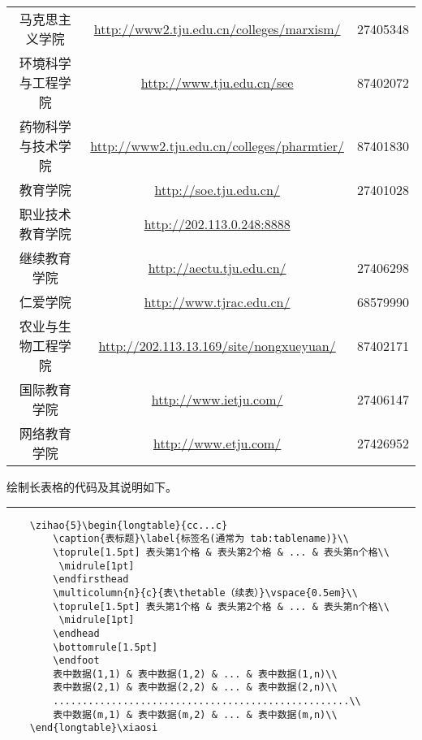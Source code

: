 \begin{longtable}{ccc}
	马克思主义学院           & \url{http://www2.tju.edu.cn/colleges/marxism/}        & 27405348      \\
	环境科学与工程学院       & \url{http://www.tju.edu.cn/see}                       & 87402072      \\
	药物科学与技术学院       & \url{http://www2.tju.edu.cn/colleges/pharmtier/}      & 87401830      \\
	教育学院                 & \url{http://soe.tju.edu.cn/}                          & 27401028      \\
	职业技术教育学院         & \url{http://202.113.0.248:8888}                                       \\
	继续教育学院             & \url{http://aectu.tju.edu.cn/}                        & 27406298      \\
	仁爱学院                 & \url{http://www.tjrac.edu.cn/}                        & 68579990      \\
	农业与生物工程学院       & \url{http://202.113.13.169/site/nongxueyuan/}         & 87402171      \\
	国际教育学院             & \url{http://www.ietju.com/}                           & 27406147      \\
	网络教育学院             & \url{http://www.etju.com/}                            & 27426952      \\
\end{longtable}
\vspace{\baselineskip}

绘制长表格的代码及其说明如下。
\vspace{1em}\noindent\hrule

\begin{verbatim}
	\zihao{5}\begin{longtable}{cc...c}
		\caption{表标题}\label{标签名(通常为 tab:tablename)}\\
		\toprule[1.5pt] 表头第1个格 & 表头第2个格 & ... & 表头第n个格\\
		 \midrule[1pt]
		\endfirsthead
		\multicolumn{n}{c}{表\thetable（续表）}\vspace{0.5em}\\
		\toprule[1.5pt] 表头第1个格 & 表头第2个格 & ... & 表头第n个格\\
		 \midrule[1pt]
		\endhead
		\bottomrule[1.5pt]
		\endfoot
		表中数据(1,1) & 表中数据(1,2) & ... & 表中数据(1,n)\\
		表中数据(2,1) & 表中数据(2,2) & ... & 表中数据(2,n)\\
		...................................................\\
		表中数据(m,1) & 表中数据(m,2) & ... & 表中数据(m,n)\\
	\end{longtable}\xiaosi
\end{verbatim}

